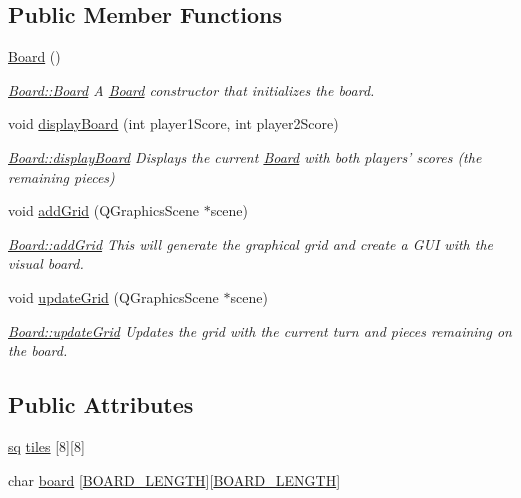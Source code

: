 \subsection*{Public Member Functions}
\begin{DoxyCompactItemize}
\item 
\hyperlink{class_board_a9ee491d4fea680cf69b033374a9fdfcb}{Board} ()
\begin{DoxyCompactList}\small\item\em \hyperlink{class_board_a9ee491d4fea680cf69b033374a9fdfcb}{Board\-::\-Board} A \hyperlink{class_board}{Board} constructor that initializes the board. \end{DoxyCompactList}\item 
void \hyperlink{class_board_ad3e7c6a4070b1dac5b124a550fa0a6fc}{display\-Board} (int player1\-Score, int player2\-Score)
\begin{DoxyCompactList}\small\item\em \hyperlink{class_board_ad3e7c6a4070b1dac5b124a550fa0a6fc}{Board\-::display\-Board} Displays the current \hyperlink{class_board}{Board} with both players' scores (the remaining pieces) \end{DoxyCompactList}\item 
void \hyperlink{class_board_a799c675452ae1a6d3dd6b2058c88f92a}{add\-Grid} (Q\-Graphics\-Scene $\ast$scene)
\begin{DoxyCompactList}\small\item\em \hyperlink{class_board_a799c675452ae1a6d3dd6b2058c88f92a}{Board\-::add\-Grid} This will generate the graphical grid and create a G\-U\-I with the visual board. \end{DoxyCompactList}\item 
void \hyperlink{class_board_a964d67ddc797487f1a018e4c7cd82075}{update\-Grid} (Q\-Graphics\-Scene $\ast$scene)
\begin{DoxyCompactList}\small\item\em \hyperlink{class_board_a964d67ddc797487f1a018e4c7cd82075}{Board\-::update\-Grid} Updates the grid with the current turn and pieces remaining on the board. \end{DoxyCompactList}\end{DoxyCompactItemize}
\subsection*{Public Attributes}
\begin{DoxyCompactItemize}
\item 
\hyperlink{structsq}{sq} \hyperlink{class_board_acd3e1340f25b2d2371d8a2862e473b15}{tiles} \mbox{[}8\mbox{]}\mbox{[}8\mbox{]}
\item 
char \hyperlink{class_board_a6e32218e7d8adc57f9d414836d135d96}{board} \mbox{[}\hyperlink{class_board_a3b3d4827430812c8849610301dbf91f3}{B\-O\-A\-R\-D\-\_\-\-L\-E\-N\-G\-T\-H}\mbox{]}\mbox{[}\hyperlink{class_board_a3b3d4827430812c8849610301dbf91f3}{B\-O\-A\-R\-D\-\_\-\-L\-E\-N\-G\-T\-H}\mbox{]}
\end{DoxyCompactItemize}
